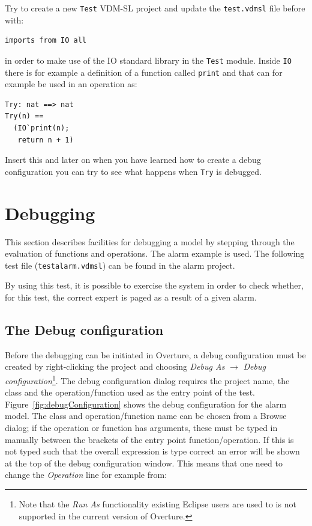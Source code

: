 {\begin{myexercise}\label{ex:tb-error}
Try to create a new \texttt{Test} VDM-SL project and update the
\texttt{test.vdmsl} file before {\bf{}} with:
\begin{lstlisting}
imports from IO all
\end{lstlisting}
in order to make use of the IO standard library in the \texttt{Test}
module. Inside \texttt{IO} there is for example a definition of a
function called \texttt{print} and that can for example be used in an
operation as:
\begin{lstlisting}
Try: nat ==> nat
Try(n) ==
  (IO`print(n);
   return n + 1)
\end{lstlisting}
Insert this and later on when you have learned how to create a debug
configuration you can try to see what happens when \texttt{Try} is
debugged. 
\end{myexercise}
 
\section{Debugging}\label{sec:debugging}

This section describes facilities for debugging a model by stepping
through the evaluation of functions and operations. The alarm example
is used. The following test file (\texttt{testalarm.vdmsl}) can be
found in the alarm project.

\lstset{language=VDM-SL}


By using this test, it is possible to exercise the system in order to
check whether, for this test, the correct expert is paged as a result
of a given alarm.


\subsection{The Debug configuration}

Before the debugging can be initiated in Overture, a debug
configuration must be created by right-clicking the project and
choosing \emph{Debug As} $ \rightarrow $ \emph{Debug
configuration}\footnote{Note that the
  \emph{Run As} functionality existing Eclipse users are used to is
  not supported in the current version of Overture.}. 
The debug configuration dialog requires the project
name, the class and the operation/function used as the entry point of the
test.
Figure~\ref{fig:debugConfiguration} shows the debug
configuration for the alarm model. The class and operation/function
name can be chosen from a Browse dialog; if the operation or function
has arguments, these must be typed in manually between the brackets of
the entry point function/operation. If this is not typed such that the
overall expression is type correct an error will be shown at the top
of the debug configuration window. This means that one need to change
the \emph{Operation} line for example from:
  
}
